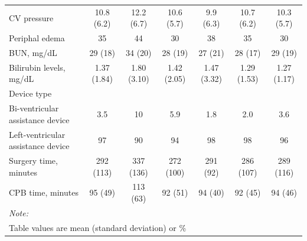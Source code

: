 \documentclass{article}
\begin{document}
\begin{table}
\begin{tabular}{lcccccc}
CV pressure & 10.8 (6.2) & 12.2 (6.7) & 10.6 (5.7) & 9.9 (6.3) & 10.7 (6.2) & 10.3 (5.7)\\
Periphal edema & 35 & 44 & 30 & 38 & 35 & 30\\
BUN, mg/dL & 29 (18) & 34 (20) & 28 (19) & 27 (21) & 28 (17) & 29 (19)\\
\addlinespace
Bilirubin levels, mg/dL & 1.37 (1.84) & 1.80 (3.10) & 1.42 (2.05) & 1.47 (3.32) & 1.29 (1.53) & 1.27 (1.17)\\
Device type &  &  &  &  &  & \\
\hspace{1em}Bi-ventricular assistance device & 3.5 & 10 & 5.9 & 1.8 & 2.0 & 3.6\\
\hspace{1em}Left-ventricular assistance device & 97 & 90 & 94 & 98 & 98 & 96\\
Surgery time, minutes & 292 (113) & 337 (136) & 272 (100) & 291 (92) & 286 (107) & 289 (116)\\
\addlinespace
CPB time, minutes & 95 (49) & 113 (63) & 92 (51) & 94 (40) & 92 (45) & 94 (46)\\
\bottomrule
\multicolumn{7}{l}{\rule{0pt}{1em}\textit{Note: }}\\
\multicolumn{7}{l}{\rule{0pt}{1em}Table values are mean (standard deviation) or \%}\\
\end{tabular}

\end{table}

\clearpage
\end{document}
